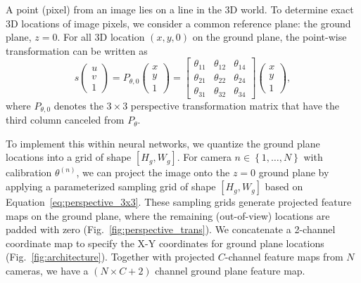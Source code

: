 \documentclass[runningheads]{llncs}
\begin{document}
A point (pixel) from an image lies on a line in the 3D world. To determine exact 3D locations of image pixels, we consider a common reference plane: the ground plane, $z=0$. For all 3D location $\left(x,y,0\right)$ on the ground plane, the point-wise transformation can be written as
\begin{equation}
\label{eq:perspective_3x3}
    s\left(\begin{matrix}u \\ v \\ 1\end{matrix}\right) = P_{\theta,0} \left(\begin{matrix} x \\ y \\ 1\end{matrix}\right) = \left[\begin{matrix} \theta_{11} & \theta_{12} & \theta_{14} \\ \theta_{21} & \theta_{22} & \theta_{24} \\ \theta_{31} & \theta_{32} & \theta_{34} \end{matrix}\right] \left(\begin{matrix} x \\ y \\ 1\end{matrix}\right),
\end{equation}
where $P_{\theta,0}$ denotes the $3\times3$ perspective transformation matrix that have the third column canceled from $P_{\theta}$. 

To implement this within neural networks, we quantize the ground plane locations into a grid of shape $\left[H_g,W_g\right]$. For camera $n\in \left\{1,\dots,N\right\}$ with calibration $\theta^{\left(n\right)}$, we can project the image onto the $z=0$ ground plane by applying a parameterized sampling grid of shape $\left[H_g,W_g\right]$ based on Equation~\ref{eq:perspective_3x3}. These sampling grids generate projected feature maps on the ground plane, where the remaining (out-of-view) locations are padded with zero (Fig.~\ref{fig:perspective_trans}). 
We concatenate a 2-channel coordinate map \cite{liu2018intriguing} to specify the X-Y coordinates for ground plane locations (Fig.~\ref{fig:architecture}). Together with projected $C$-channel feature maps from $N$ cameras, we have a $\left(N\times C+2\right)$ channel ground plane feature map. 
\end{document}

